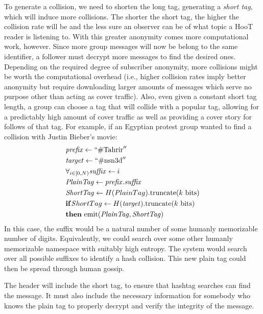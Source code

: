 To generate a collision, we need to shorten the long tag, generating a \textit{short tag}, which will induce more collisions. The shorter the short tag, the higher the collision rate will be and the less sure an observer can be of what topic a HooT reader is listening to. With this greater anonymity comes more computational work, however. Since more group messages will now be belong to the same identifier, a follower must decrypt more messages to find the desired ones. Depending on the required degree of subscriber anonymity, more collisions might be worth the computational overhead (i.e., higher collision rates imply better anonymity but require downloading larger amounts of messages which serve no purpose other than acting as cover traffic). Also, even given a constant short tag length, a group can choose a tag that will collide with a popular tag, allowing for a predictably high amount of cover traffic as well as providing a cover story for follows of that tag. For example, if an Egyptian protest group wanted to find a collision with Justin Bieber's movie:
%
\begin{align*}
& \mathit{prefix} \leftarrow  ``\mathrm{\#Tahrir}'' \\
& \mathit{target} \leftarrow ``\mathrm{\#nsn3d}'' \\
& \forall_{i \in [0, N)}  \mathit{suffix} \leftarrow i \\
& \mathit{PlainTag} \leftarrow  \mathit{prefix}.\mathit{suffix} \\
& \mathit{ShortTag} \leftarrow H({\mathit PlainTag}).\mathrm{truncate}(k\ \mathrm{bits}) \\
& \mathbf{if} {\mathit ShortTag} \leftarrow H(\mathit{target}).\mathrm{truncate}(k\ \mathrm{bits})\\
& \mathbf{then}\ \mathrm{emit} (\mathit{PlainTag} , {\mathit{ShortTag}})
\end{align*}
%
In this case, the suffix would be a natural number of some humanly memorizable number of digits. Equivalently, we could search over some other humanly memorizable namespace with suitably high entropy. The system would search over all possible suffixes to identify a hash collision. This new plain tag could then be spread through human gossip.

The header will include the short tag, to ensure that hashtag searches can find the message. It must also include the necessary information for somebody who knows the plain tag to properly decrypt and verify the integrity of the message. 

